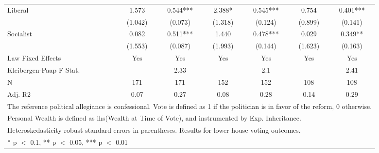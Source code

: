 \begin{table}
\begin{tabular}[t]{lcccccc}
Liberal & \num{1.573} & \num{0.544}*** & \num{2.388}* & \num{0.545}*** & \num{0.754} & \num{0.401}***\\
 & (\num{1.042}) & (\num{0.073}) & (\num{1.318}) & (\num{0.124}) & (\num{0.899}) & (\num{0.141})\\
Socialist & \num{0.082} & \num{0.511}*** & \num{1.440} & \num{0.478}*** & \num{0.029} & \num{0.349}**\\
 & (\num{1.553}) & (\num{0.087}) & (\num{1.993}) & (\num{0.144}) & (\num{1.623}) & (\num{0.163})\\
\midrule
Law Fixed Effects & Yes & Yes & Yes & Yes & Yes & Yes\\
Kleibergen-Paap F Stat. &  & 2.33 &  & 2.1 &  & 2.41\\
N & \num{171} & \num{171} & \num{152} & \num{152} & \num{108} & \num{108}\\
Adj. R2 & \num{0.07} & \num{0.27} & \num{0.08} & \num{0.28} & \num{0.14} & \num{0.29}\\
\bottomrule
\multicolumn{7}{l}{\rule{0pt}{1em}The reference political allegiance is confessional. Vote is defined as 1 if the politician is in favor of the reform, 0 otherwise.}\\
\multicolumn{7}{l}{\rule{0pt}{1em}Personal Wealth is defined as ihs(Wealth at Time of Vote), and instrumented by Exp. Inheritance.}\\
\multicolumn{7}{l}{\rule{0pt}{1em}Heteroskedasticity-robust standard errors in parentheses. Results for lower house voting outcomes.}\\
\multicolumn{7}{l}{\rule{0pt}{1em}* p $<$ 0.1, ** p $<$ 0.05, *** p $<$ 0.01}\\
\end{tabular}
\end{table}

